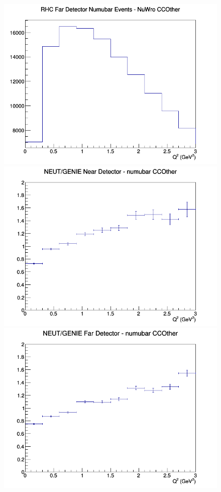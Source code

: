\documentclass[12pt]{article}
\begin{document}
\begin{figure}[h]
\endminipage
{}
\includegraphics[width=\linewidth]{Q2/nominal/CCOther_RHC_FD_numubar_Q2_NuWro.png}
\endminipage
\newline
{}
\includegraphics[width=\linewidth]{Q2/nominal/ratios/CCOther_NEUT_GENIE_numubar_near_Q2.png}
\endminipage
{}
\includegraphics[width=\linewidth]{Q2/nominal/ratios/CCOther_NEUT_GENIE_numubar_far_Q2.png}

\end{figure}
\end{document}

